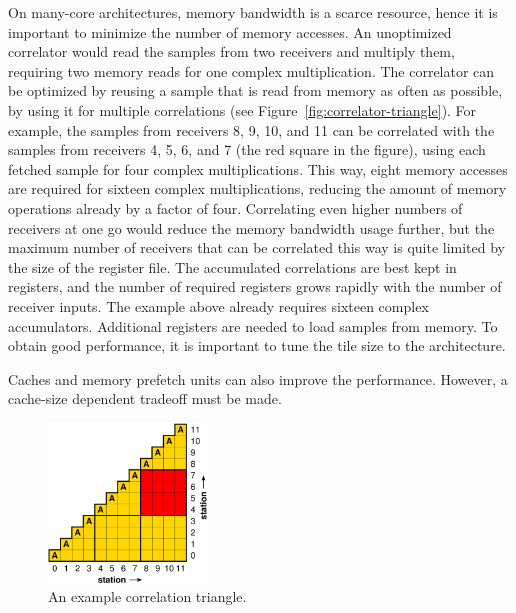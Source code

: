 \documentclass{article}
\begin{document}
On many-core architectures, memory bandwidth is a scarce resource, hence it is
important to minimize the number of memory accesses.
An unoptimized correlator would read the samples from two receivers and
multiply them, requiring two memory reads for one complex multiplication.
The correlator can be optimized by reusing a sample that is read from memory
as often as possible, by using it for multiple correlations (see
Figure~\ref{fig:correlator-triangle}).
For example, the samples from receivers 8, 9, 10, and 11 can be correlated
with the samples from receivers 4, 5, 6, and 7 (the red square in the figure),
using each fetched sample for four complex multiplications.
This way, eight memory accesses are required for sixteen complex
multiplications, reducing the amount of memory operations already by a factor
of four.
Correlating even higher numbers of receivers at one go would reduce the
memory bandwidth usage further, but the maximum number of receivers that can
be correlated this way is quite limited by the size of the register file.
The accumulated correlations are best kept in registers, and the number of
required registers grows rapidly with the number of receiver inputs.
The example above already requires sixteen complex accumulators.
Additional registers are needed to load samples from memory.
To obtain good performance, it is important to tune the tile size to the
architecture.

Caches and memory prefetch units can also improve the performance.
However, a cache-size dependent tradeoff must be made.




\begin{figure}[t]
\begin{center}
\includegraphics[width=4.2cm]{figures/correlation-triangle.pdf}
\end{center}
\vspace{-0.5cm}
\caption{An example correlation triangle.}
\label{fig-correlation}
\end{figure}
\end{document}

